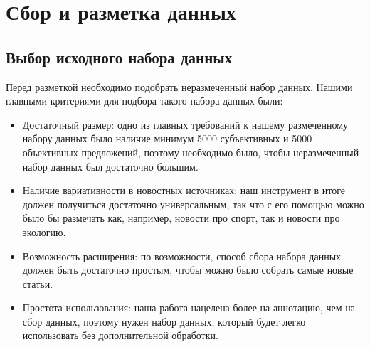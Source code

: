 \documentclass[conference]{IEEEtran}
\begin{document}
\section{Сбор и разметка данных}
\subsection{Выбор исходного набора данных}
Перед разметкой необходимо подобрать неразмеченный набор данных. Нашими главными критериями для подбора такого набора данных были: 
\begin{itemize}
    \item Достаточный размер: одно из главных требований к нашему размеченному набору данных было наличие минимум 5000 субъективных и 5000 объективных предложений, поэтому необходимо было, чтобы неразмеченный набор данных был достаточно большим.
    \item Наличие вариативности в новостных источниках: наш инструмент в итоге должен получиться достаточно универсальным, так что с его помощью можно было бы размечать как, например, новости про спорт, так и новости про экологию.
    \item Возможность расширения: по возможности, способ сбора набора данных должен быть достаточно простым, чтобы можно было собрать самые новые статьи.
    \item Простота использования: наша работа нацелена более на аннотацию, чем на сбор данных, поэтому нужен набор данных, который будет легко использовать без дополнительной обработки.
\end{itemize}
\end{document}

